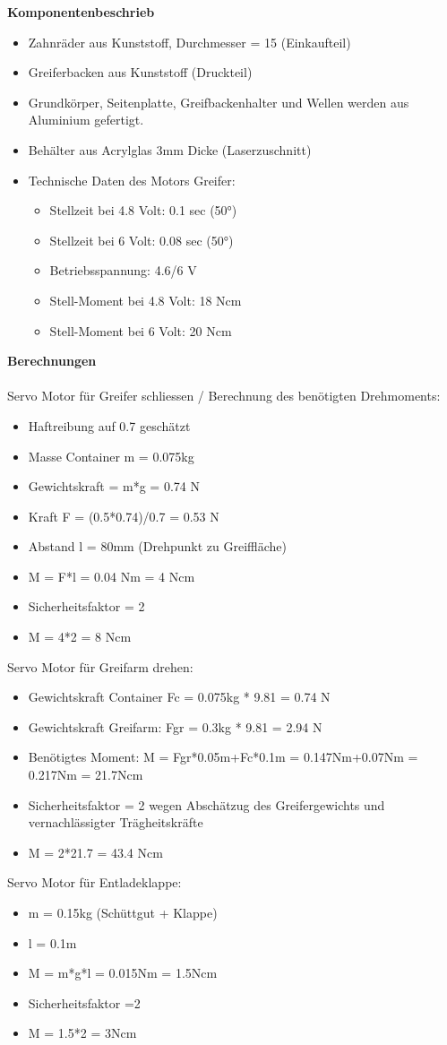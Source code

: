 \textbf{Komponentenbeschrieb}\\[0.2cm]
\begin{itemize}
\item Zahnräder aus Kunststoff, Durchmesser = 15 (Einkaufteil)
\item Greiferbacken aus Kunststoff (Druckteil)
\item Grundkörper, Seitenplatte, Greifbackenhalter und Wellen werden aus Aluminium gefertigt.
\item Behälter aus Acrylglas 3mm Dicke (Laserzuschnitt)
\item Technische Daten des Motors Greifer:
\begin{itemize}
\item Stellzeit bei 4.8 Volt: 0.1 sec (50°) 
\item Stellzeit bei 6 Volt: 0.08 sec (50°) 
\item Betriebsspannung: 4.6/6 V
\item Stell-Moment bei 4.8 Volt: 18 Ncm
\item Stell-Moment bei 6 Volt: 20 Ncm 
\end{itemize}
\end{itemize}
\textbf{Berechnungen}\\[0.2cm]
\\[0.2cm]
Servo Motor für Greifer schliessen /
Berechnung des benötigten Drehmoments: 
\begin{itemize}
\item Haftreibung auf 0.7 geschätzt
\item Masse Container m = 0.075kg
\item Gewichtskraft = m*g = 0.74 N
\item Kraft F = (0.5*0.74)/0.7 = 0.53 N
\item Abstand l = 80mm (Drehpunkt zu Greiffläche)
\item M = F*l = 0.04 Nm = 4 Ncm
\item Sicherheitsfaktor = 2
\item M = 4*2 = 8 Ncm
\end{itemize}
Servo Motor für Greifarm drehen:
\begin{itemize}
\item Gewichtskraft Container Fc = 0.075kg * 9.81 = 0.74 N
\item Gewichtskraft Greifarm: Fgr = 0.3kg * 9.81 = 2.94 N
\item Benötigtes Moment:
M = Fgr*0.05m+Fc*0.1m = 0.147Nm+0.07Nm = 0.217Nm = 21.7Ncm
\item Sicherheitsfaktor = 2 wegen Abschätzug des Greifergewichts und vernachlässigter Trägheitskräfte
\item M = 2*21.7 = 43.4 Ncm
\end{itemize}
Servo Motor für Entladeklappe:
\begin{itemize}
\item m = 0.15kg (Schüttgut + Klappe)
\item l = 0.1m
\item M = m*g*l = 0.015Nm = 1.5Ncm
\item Sicherheitsfaktor =2
\item M = 1.5*2 = 3Ncm
\end{itemize}